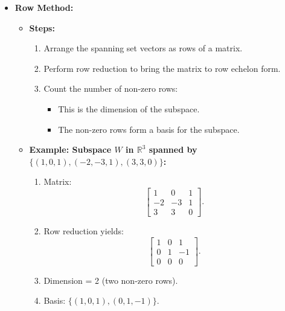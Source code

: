 \documentclass{article}
\begin{document}
\begin{itemize}
  \item \textbf{Row Method:}
    \begin{itemize}
      \item \textbf{Steps:}
        \begin{enumerate}
          \item Arrange the spanning set vectors as rows of a matrix.
          \item Perform row reduction to bring the matrix to row echelon form.
          \item Count the number of non-zero rows:
            \begin{itemize}
              \item This is the dimension of the subspace.
              \item The non-zero rows form a basis for the subspace.
            \end{itemize}
        \end{enumerate}
      \item \textbf{Example: Subspace $W$ in $\mathbb{R}^3$ spanned by $\{(1, 0, 1), (-2, -3, 1), (3, 3, 0)\}$:}
        \begin{enumerate}
          \item Matrix:
            \[
              \begin{bmatrix}
                1 & 0 & 1 \\
                -2 & -3 & 1 \\
                3 & 3 & 0
              \end{bmatrix}.
            \]
          \item Row reduction yields:
            \[
              \begin{bmatrix}
                1 & 0 & 1 \\
                0 & 1 & -1 \\
                0 & 0 & 0
              \end{bmatrix}.
            \]
          \item Dimension = 2 (two non-zero rows).
          \item Basis: $\{(1, 0, 1), (0, 1, -1)\}$.
        \end{enumerate}
    \end{itemize}


\end{itemize}
\end{document}
